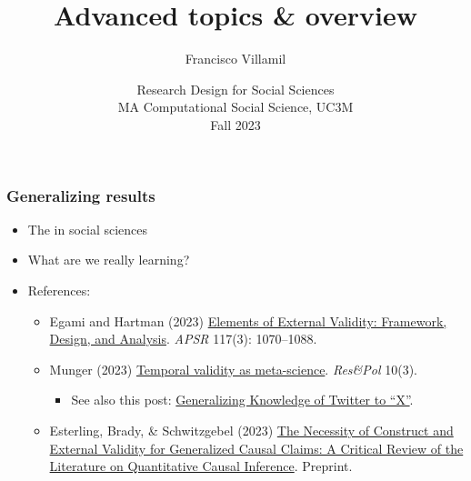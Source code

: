 \documentclass[aspectratio=43]{beamer}
\title[Lecture 5: Advanced topics]{\Large Advanced topics \& overview}
\author[]{Francisco Villamil}
\date[]{Research Design for Social Sciences\\MA Computational Social Science, UC3M\\Fall 2023}
\begin{document}

\begin{frame}
  \titlepage
\end{frame}

\begin{frame}
\frametitle{Generalizing results}
\centering

\begin{itemize}
  \item The  in social sciences
  \item What are we really learning?
  \item References:
  \begin{itemize}
    \item Egami and Hartman (2023) \href{https://doi.org/10.1017/S0003055422000880}{Elements of External Validity: Framework, Design, and Analysis}. \textit{APSR} 117(3): 1070--1088.
    \item Munger (2023) \href{https://doi.org/10.1177/20531680231187271}{Temporal validity as meta-science}. \textit{Res\&Pol} 10(3).
    \begin{itemize}
      \item See also this post: \href{https://kevinmunger.substack.com/p/generalizing-knowledge-of-twitter}{Generalizing Knowledge of Twitter to ``X''}.
    \end{itemize}
    \item Esterling, Brady, \& Schwitzgebel (2023) \href{https://osf.io/2s8w5/}{The Necessity of Construct and External Validity for Generalized Causal Claims: A Critical Review of the Literature on Quantitative Causal Inference}. Preprint.
  \end{itemize}
\end{itemize}

\end{frame}
\end{document}
